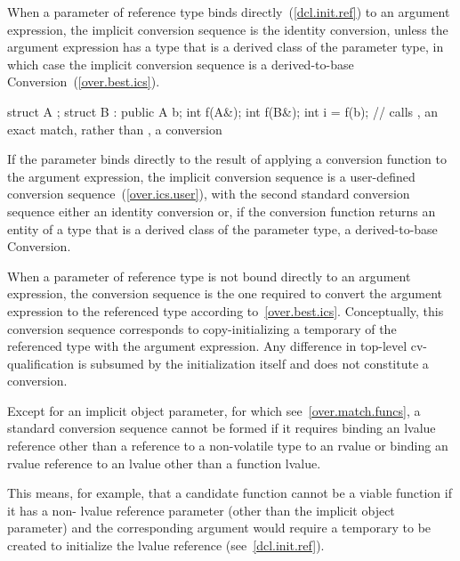 \pnum
When a parameter of reference type binds directly~(\ref{dcl.init.ref}) to an
argument expression, the implicit conversion sequence is the identity conversion,
unless the argument expression has a type that is a derived class of the parameter
type, in which case the implicit conversion sequence is a derived-to-base
Conversion~(\ref{over.best.ics}).
\begin{example}

\begin{codeblock}
struct A {};
struct B : public A {} b;
int f(A&);
int f(B&);
int i = f(b);       // calls , an exact match, rather than , a conversion
\end{codeblock}
\end{example}
If the parameter binds directly to the result of
applying a conversion function to the argument expression, the implicit
conversion sequence is a user-defined conversion sequence~(\ref{over.ics.user}),
with the second standard conversion sequence either an identity conversion or,
if the conversion function returns an entity of a type that is a derived class
of the parameter type, a derived-to-base Conversion.

\pnum
When a parameter of reference type is not bound directly to an argument
expression, the conversion sequence is the one required to convert the argument
expression to the referenced type according to~\ref{over.best.ics}.
Conceptually, this conversion sequence corresponds to copy-initializing a
temporary of the referenced type with the argument expression.
Any difference
in top-level cv-qualification is subsumed by the initialization itself and
does not constitute a conversion.

\pnum
Except for an implicit object parameter, for which see~\ref{over.match.funcs}, a
standard conversion sequence cannot be formed if it requires
binding an lvalue reference
other than a reference to a non-volatile  type
to an rvalue
or binding an rvalue reference to an lvalue other than a function lvalue.
\begin{note}
This means, for example, that a candidate function cannot be a viable
function if it has a non- lvalue reference parameter (other than
the implicit object parameter) and the corresponding argument
would require a temporary to be created to initialize the lvalue
reference (see~\ref{dcl.init.ref}).
\end{note}

